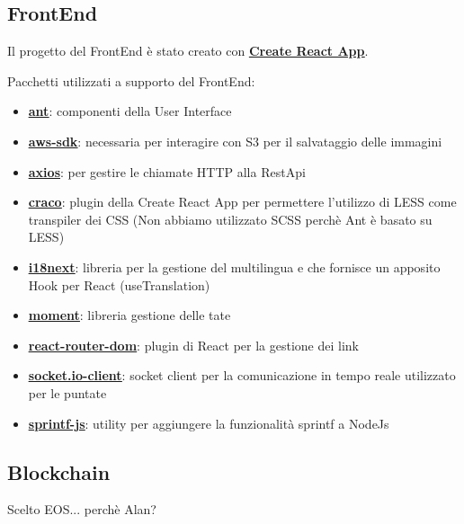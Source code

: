 \clearpage

\subsection{FrontEnd}
Il progetto del FrontEnd è stato creato con \textbf{\underline{\href{https://create-react-app.dev/}{Create React App}}}.

Pacchetti utilizzati a supporto del FrontEnd:

\begin{itemize}
	\item \textbf{\underline{\href{https://ant.design/}{ant}}}: componenti della User Interface
	\item \textbf{\underline{\href{https://www.npmjs.com/package/aws-sdk}{aws-sdk}}}: necessaria per interagire con S3 per il salvataggio delle immagini
	\item \textbf{\underline{\href{https://www.npmjs.com/package/axios}{axios}}}: per gestire le chiamate HTTP alla RestApi
	\item \textbf{\underline{\href{https://ant.design/docs/react/use-with-create-react-app}{craco}}}: plugin della Create React App per permettere l'utilizzo di LESS come transpiler dei CSS (Non abbiamo utilizzato SCSS perchè Ant è basato su LESS)
	\item \textbf{\underline{\href{https://react.i18next.com/latest/using-with-hooks}{i18next}}}: libreria per la gestione del multilingua e che fornisce un apposito Hook per React (useTranslation)
	\item \textbf{\underline{\href{https://momentjs.com}{moment}}}: libreria gestione delle tate
	\item \textbf{\underline{\href{https://reactrouter.com/web/guides/quick-start}{react-router-dom}}}: plugin di React per la gestione dei link
	\item \textbf{\underline{\href{https://www.npmjs.com/package/socket.io-client}{socket.io-client}}}: socket client per la comunicazione in tempo reale utilizzato per le puntate
	\item \textbf{\underline{\href{https://www.npmjs.com/package/sprintf-js}{sprintf-js}}}: utility per aggiungere la funzionalità sprintf a NodeJs
\end{itemize}

\clearpage

\subsection{Blockchain}
Scelto EOS... perchè Alan?
